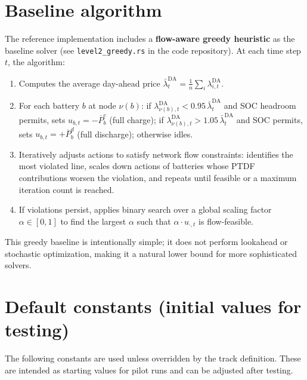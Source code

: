\documentclass[11pt]{article}
\begin{document}
\section{Baseline algorithm}
The reference implementation includes a \textbf{flow-aware greedy heuristic} as the baseline solver (see \texttt{level2\_greedy.rs} in the code repository). At each time step $t$, the algorithm:
\begin{enumerate}
\item Computes the average day-ahead price $\bar{\lambda}_t^{\mathrm{DA}}=\frac{1}{n}\sum_{i}\lambda^{\mathrm{DA}}_{i,t}$.
\item For each battery $b$ at node $\nu(b)$: if $\lambda^{\mathrm{DA}}_{\nu(b),t}<0.95\,\bar{\lambda}_t^{\mathrm{DA}}$ and SOC headroom permits, sets $u_{b,t}=-\overline{P}^c_b$ (full charge); if $\lambda^{\mathrm{DA}}_{\nu(b),t}>1.05\,\bar{\lambda}_t^{\mathrm{DA}}$ and SOC permits, sets $u_{b,t}=+\overline{P}^d_b$ (full discharge); otherwise idles.
\item Iteratively adjusts actions to satisfy network flow constraints: identifies the most violated line, scales down actions of batteries whose PTDF contributions worsen the violation, and repeats until feasible or a maximum iteration count is reached.
\item If violations persist, applies binary search over a global scaling factor $\alpha\in[0,1]$ to find the largest $\alpha$ such that $\alpha\cdot u_{\cdot,t}$ is flow-feasible.
\end{enumerate}
This greedy baseline is intentionally simple; it does not perform lookahead or stochastic optimization, making it a natural lower bound for more sophisticated solvers.

\appendix

\section{Default constants (initial values for testing)}\label{app:constants}
The following constants are used unless overridden by the track definition. These are intended as starting values for pilot runs and can be adjusted after testing.
\end{document}
